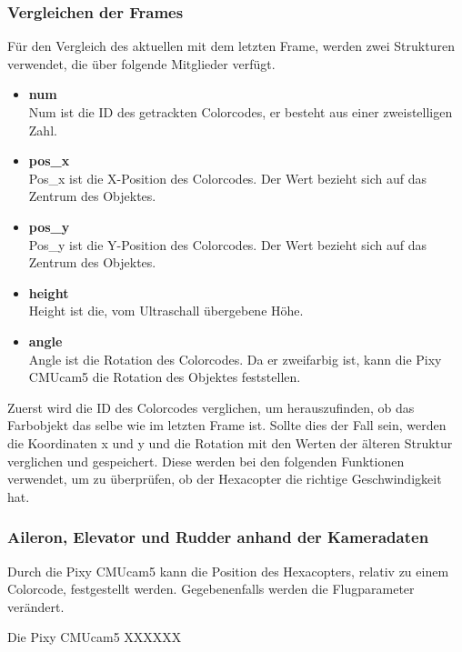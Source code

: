     \subsubsection{Vergleichen der Frames}
    Für den Vergleich des aktuellen mit dem letzten Frame, werden zwei Strukturen verwendet, die über folgende Mitglieder verfügt.
    \begin{itemize}
      \item \textbf{num}\\
      Num ist die ID des getrackten Colorcodes, er besteht aus einer zweistelligen Zahl.
      \item \textbf{pos\_x}\\
      Pos\_x ist die X-Position des Colorcodes. Der Wert bezieht sich auf das Zentrum des Objektes.
      \item \textbf{pos\_y}\\
      Pos\_y ist die Y-Position des Colorcodes. Der Wert bezieht sich auf das Zentrum des Objektes.
      \item \textbf{height}\\
      Height ist die, vom Ultraschall übergebene Höhe.
      \item \textbf{angle}\\
      Angle ist die Rotation des Colorcodes. Da er zweifarbig ist, kann die Pixy CMUcam5 die Rotation des Objektes feststellen.
    \end{itemize}

    Zuerst wird die ID des Colorcodes verglichen, um herauszufinden, ob das Farbobjekt das selbe wie im letzten Frame ist.
    Sollte dies der Fall sein, werden die Koordinaten x und y und die Rotation mit den Werten der älteren Struktur verglichen und gespeichert.
    Diese werden bei den folgenden Funktionen verwendet, um zu überprüfen, ob der Hexacopter die richtige Geschwindigkeit hat.

    \subsubsection{Aileron, Elevator und Rudder anhand der Kameradaten}
    Durch die Pixy CMUcam5 kann die Position des Hexacopters, relativ zu einem Colorcode, festgestellt werden. Gegebenenfalls werden die Flugparameter verändert.

    Die Pixy CMUcam5 XXXXXX %



